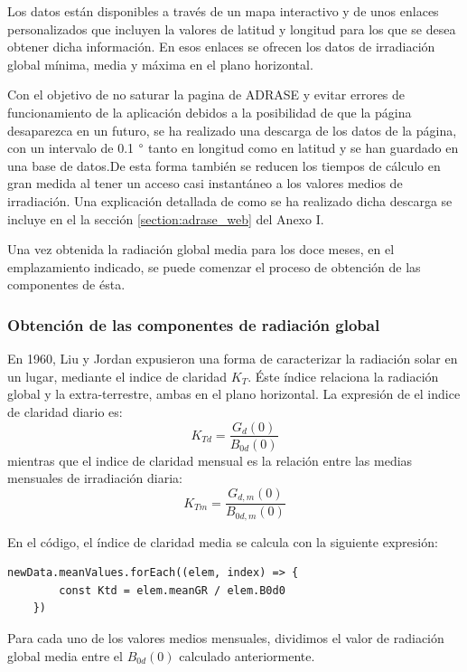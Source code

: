 Los datos están disponibles a través de un mapa interactivo y de unos enlaces personalizados que incluyen la valores de latitud y longitud para los que se desea obtener dicha información. En esos enlaces se ofrecen los datos de irradiación global mínima, media y máxima en el plano horizontal.

Con el objetivo de no saturar la pagina de ADRASE y evitar errores de funcionamiento de la aplicación debidos a la posibilidad de que la página desaparezca en un futuro, se ha realizado una descarga de los datos de la página, con un intervalo de 0.1 $\degree$ tanto en longitud como en latitud y se han guardado en una base de datos.De esta forma también se reducen los tiempos de cálculo en gran medida al tener un acceso casi instantáneo a los valores medios de irradiación. 
Una explicación detallada de como se ha realizado dicha descarga se incluye en el la sección \ref{section:adrase_web} del Anexo I.

Una vez obtenida la radiación global media para los doce meses, en el emplazamiento indicado, se puede comenzar el proceso de obtención de las componentes de ésta.

\subsubsection{Obtención de las componentes de radiación global}

En 1960, Liu y Jordan \cite{lj60} expusieron una forma de caracterizar la radiación solar en un lugar, mediante el indice de claridad $K_T$. Éste índice relaciona la radiación global y la extra-terrestre, ambas en el plano horizontal. La expresión de el indice de claridad diario es:\\

\begin{equation}
\label{eqn:ktd}
K_{Td} = \frac{G_d(0)}{B_{0d}(0)}
\end{equation}
mientras que el indice de claridad mensual es la relación entre las medias mensuales de irradiación diaria:
\begin{equation}
K_{Tm} = \frac{G_{d,m}(0)}{B_{0d,m}(0)}
\end{equation}

En el código, el índice de claridad media se calcula con la siguiente expresión:
\begin{lstlisting}[style=ES6, caption={Índice de claridad diario}]
	newData.meanValues.forEach((elem, index) => {
		const Ktd = elem.meanGR / elem.B0d0
	})
\end{lstlisting}
Para cada uno de los valores medios mensuales, dividimos el valor de radiación global media entre el $B_{0d}(0)$ calculado anteriormente.

